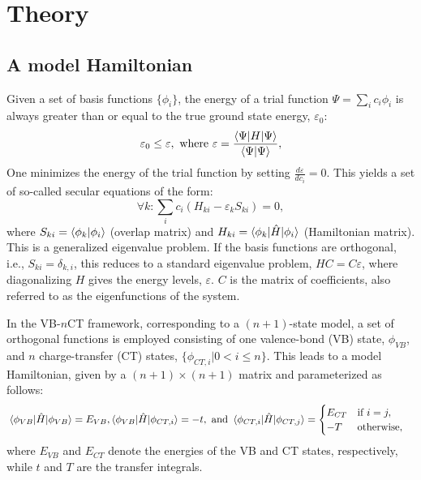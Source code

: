 \documentclass[12pt,a4paper]{article}
\begin{document}
\section{Theory}

\subsection{A model Hamiltonian}\label{sec:hamiltonian}

Given a set of basis functions $\{\phi_i\}$, the energy of a trial function $\Psi = \sum_i c_i \phi_i$ is always greater than or equal to the true ground state energy, $\varepsilon_0$:\begin{equation*}
	 \varepsilon_0 \leq \varepsilon, \text{ where } \varepsilon = \frac{\braket{\Psi|H|\Psi}}{\braket{\Psi|\Psi}},
\end{equation*}
One minimizes the energy of the trial function by setting $\frac{d\varepsilon}{dc_i} = 0$. 
This yields a set of so-called secular equations of the form:\begin{equation}
	\forall k: \sum_i c_i (H_{ki} - \varepsilon_k S_{ki}) = 0, 
\end{equation}
where $S_{ki} = \braket{\phi_k | \phi_i}$ (overlap matrix) and $H_{ki} = \braket{\phi_k | \hat{H} | \phi_i}$ (Hamiltonian matrix). 
This is a generalized eigenvalue problem. 
If the basis functions are orthogonal, i.e., $S_{ki} = \delta_{k,i}$, this reduces to a standard eigenvalue problem, $HC=C\varepsilon$, where diagonalizing $H$ gives the energy levels, $\varepsilon$. $C$ is the matrix of coefficients, also referred to as the eigenfunctions of the system.

In the VB-$n$CT framework, corresponding to a $(n+1)$-state model, a set of orthogonal functions is employed consisting of one valence-bond (VB) state, $\phi_{VB}$, and $n$ charge-transfer (CT) states, $\{\phi_{CT,i}|0<i\leq n\}$. This leads to a model Hamiltonian, given by a $(n+1)\times(n+1)$ matrix and parameterized as follows:
\begin{align}
	&\braket{\phi_{VB}|\hat{H}|\phi_{VB}} = E_{VB}, 
	\braket{\phi_{VB}|\hat{H}|\phi_{CT,i}} = -t, \text{ and } 
	\braket{\phi_{CT,i}|\hat{H}|\phi_{CT,j}} = \begin{cases}
		E_{CT} & \text{if } i=j,\\
		-T & \text{otherwise},
	\end{cases}\label{eq:hamilonian}
\end{align}
where $E_{VB}$ and $E_{CT}$ denote the energies of the VB and CT states, respectively, while $t$ and $T$ are the transfer integrals. 
\end{document}
